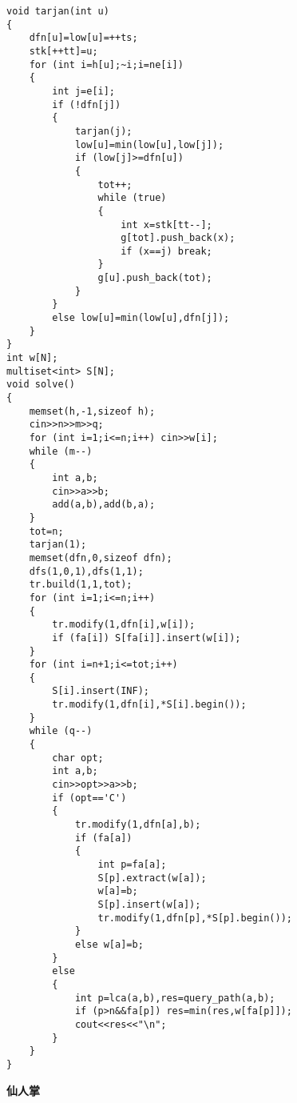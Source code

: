 \documentclass[a4paper]{ctexart}
\begin{document}
\begin{lstlisting}
void tarjan(int u)
{
    dfn[u]=low[u]=++ts;
    stk[++tt]=u;
    for (int i=h[u];~i;i=ne[i])
    {
        int j=e[i];
        if (!dfn[j])
        {
            tarjan(j);
            low[u]=min(low[u],low[j]);
            if (low[j]>=dfn[u])
            {
                tot++;
                while (true)
                {
                    int x=stk[tt--];
                    g[tot].push_back(x);
                    if (x==j) break;
                }
                g[u].push_back(tot);
            }
        }
        else low[u]=min(low[u],dfn[j]);
    }
}
int w[N];
multiset<int> S[N];
void solve()
{       
    memset(h,-1,sizeof h);
    cin>>n>>m>>q;
    for (int i=1;i<=n;i++) cin>>w[i];
    while (m--)
    {
        int a,b;
        cin>>a>>b;
        add(a,b),add(b,a);
    }
    tot=n;
    tarjan(1);
    memset(dfn,0,sizeof dfn);
    dfs(1,0,1),dfs(1,1);
    tr.build(1,1,tot);
    for (int i=1;i<=n;i++)
    {
        tr.modify(1,dfn[i],w[i]);
        if (fa[i]) S[fa[i]].insert(w[i]);
    }
    for (int i=n+1;i<=tot;i++)
    {
        S[i].insert(INF);
        tr.modify(1,dfn[i],*S[i].begin());
    }
    while (q--)
    {
        char opt;
        int a,b;
        cin>>opt>>a>>b;
        if (opt=='C')
        {
            tr.modify(1,dfn[a],b);
            if (fa[a])
            {
                int p=fa[a];
                S[p].extract(w[a]);
                w[a]=b;
                S[p].insert(w[a]);
                tr.modify(1,dfn[p],*S[p].begin());
            }
            else w[a]=b;
        }
        else
        {
            int p=lca(a,b),res=query_path(a,b);
            if (p>n&&fa[p]) res=min(res,w[fa[p]]);
            cout<<res<<"\n"; 
        }
    }
}
\end{lstlisting}

\textbf{仙人掌}
\end{document}
